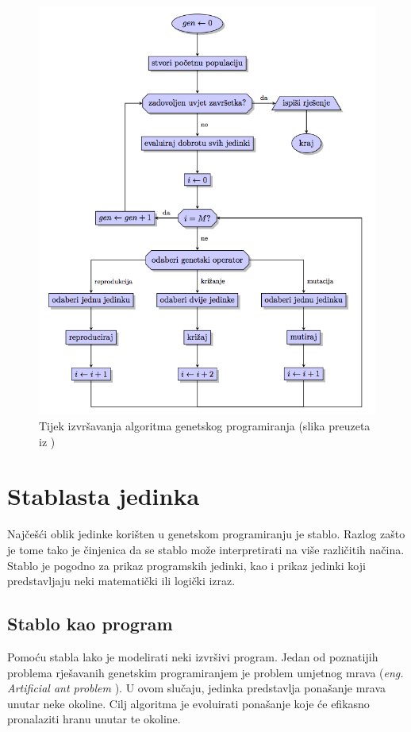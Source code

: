 \begin{figure}[H]
	\centering
	\includegraphics[scale=0.6]{./slike/blokDijagram.png}
	\caption{Tijek izvršavanja algoritma genetskog programiranja (slika preuzeta iz \cite{kokan})}
	\label{tijek}
\end{figure}

\section{Stablasta jedinka}
Najčešći oblik jedinke korišten u genetskom programiranju je stablo. Razlog zašto je tome tako je činjenica da se stablo može interpretirati na više različitih načina. Stablo je pogodno za prikaz programskih jedinki, kao i prikaz jedinki koji predstavljaju neki matematički ili logički izraz.


\subsection{Stablo kao program}
Pomoću stabla lako je modelirati neki izvršivi program. Jedan od poznatijih problema rješavanih genetskim programiranjem je problem umjetnog mrava (\textit{eng. Artificial ant problem} \cite{koza}). U ovom slučaju, jedinka predstavlja ponašanje mrava unutar neke okoline. Cilj algoritma je evoluirati ponašanje koje će efikasno pronalaziti hranu unutar te okoline.

